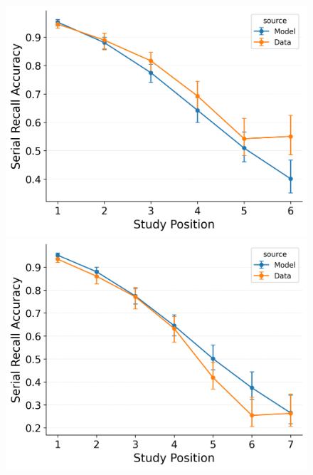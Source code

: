\documentclass[
  man,
  floatsintext,
  longtable,
  nolmodern,
  notxfonts,
  notimes,
  draftfirst,
  colorlinks=true,linkcolor=blue,citecolor=blue,urlcolor=blue]{apa7}
\begin{document}
\begin{figure}
\begin{minipage}{0.33\linewidth}
\includegraphics{figures/Gordon2021_CRU_with_Pre-Expt_and_Primacy__and_ContextTerm_Confusable_Fitting_srac_LL6.png}\end{minipage}%
%
\begin{minipage}{0.33\linewidth}
\includegraphics{figures/Gordon2021_CRU_with_Pre-Expt_and_Primacy__and_ContextTerm_Confusable_Fitting_srac_LL7.png}\end{minipage}%
\newline
\begin{minipage}{0.33\linewidth}

\end{minipage}
\end{figure}
\end{document}
